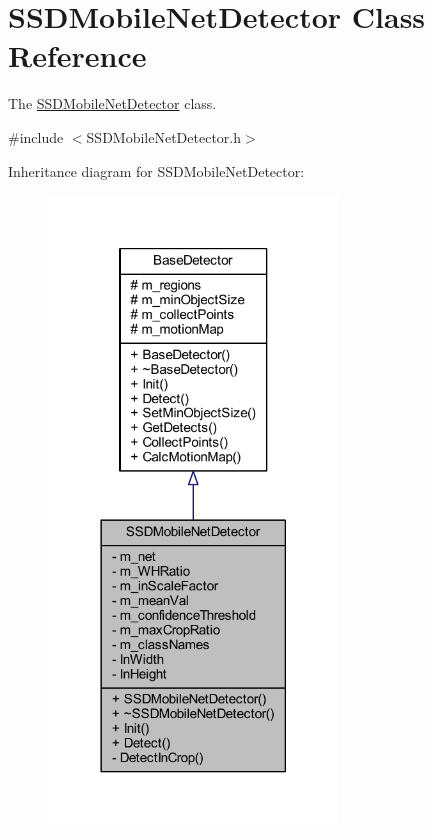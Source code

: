 \hypertarget{class_s_s_d_mobile_net_detector}{}\section{S\+S\+D\+Mobile\+Net\+Detector Class Reference}
\label{class_s_s_d_mobile_net_detector}


The \mbox{\hyperlink{class_s_s_d_mobile_net_detector}{S\+S\+D\+Mobile\+Net\+Detector}} class.  




{\ttfamily \#include $<$S\+S\+D\+Mobile\+Net\+Detector.\+h$>$}



Inheritance diagram for S\+S\+D\+Mobile\+Net\+Detector\+:\nopagebreak
\begin{figure}[H]
\begin{center}
\leavevmode
\includegraphics[width=218pt]{class_s_s_d_mobile_net_detector__inherit__graph}
\end{center}
\end{figure}


